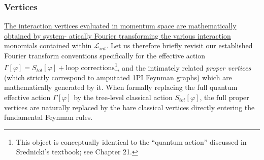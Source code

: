 \begin{figure}[H]
    \centering
\end{figure}

\subsubsection{Vertices}

\uline{The interaction vertices evaluated in momentum space are mathematically obtained by system- atically Fourier transforming the various interaction monomials contained within $\mathcal{L}_{int}$}. Let us therefore briefly revisit our established Fourier transform conventions specifically for the effective action $\Gamma[\varphi] = S_{tot}[\varphi] + \text{loop corrections}$\footnote{This object is conceptually identical to the ``quantum action'' discussed in Srednicki's textbook; see Chapter 21.}, and the intimately related \textit{proper vertices} (which strictly correspond to amputated 1PI Feynman graphs) which are mathematically generated by it. When formally replacing the full quantum effective action $\Gamma[\varphi]$ by the tree-level classical action $S_{tot}[\varphi]$, the full proper vertices are naturally replaced by the bare classical vertices directly entering the fundamental Feynman rules.

